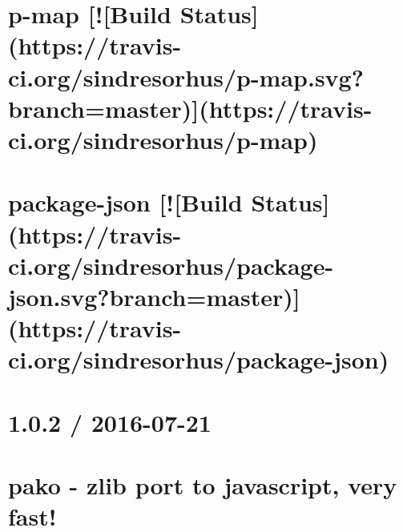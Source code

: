 \documentclass[twoside]{book}
\newcommand{\+}{\discretionary{\mbox{\scriptsize$\hookleftarrow$}}{}{}}
\begin{document}
\chapter{p-\/map \mbox{[}!\mbox{[}Build Status\mbox{]}(https\+://travis-\/ci.org/sindresorhus/p-\/map.svg?branch=master)\mbox{]}(https\+://travis-\/ci.org/sindresorhus/p-\/map)}
\label{md__c_1_workspace_demo_src_main_script_node_modules_p-map_readme}

\chapter{package-\/json \mbox{[}!\mbox{[}Build Status\mbox{]}(https\+://travis-\/ci.org/sindresorhus/package-\/json.svg?branch=master)\mbox{]}(https\+://travis-\/ci.org/sindresorhus/package-\/json)}
\label{md__c_1_workspace_demo_src_main_script_node_modules_package-json_readme}

\chapter{1.0.2 / 2016-\/07-\/21}
\label{md__c_1_workspace_demo_src_main_script_node_modules_pako__c_h_a_n_g_e_l_o_g}

\chapter{pako -\/ zlib port to javascript, very fast!}
\label{md__c_1_workspace_demo_src_main_script_node_modules_pako__r_e_a_d_m_e}

\chapter{Param Case}
\label{md__c_1_workspace_demo_src_main_script_node_modules_param-case__r_e_a_d_m_e}

\chapter{R\+E\+A\+D\+ME}
\label{md__c_1_workspace_demo_src_main_script_node_modules_parse-asn1__r_e_a_d_m_e}

\end{document}

